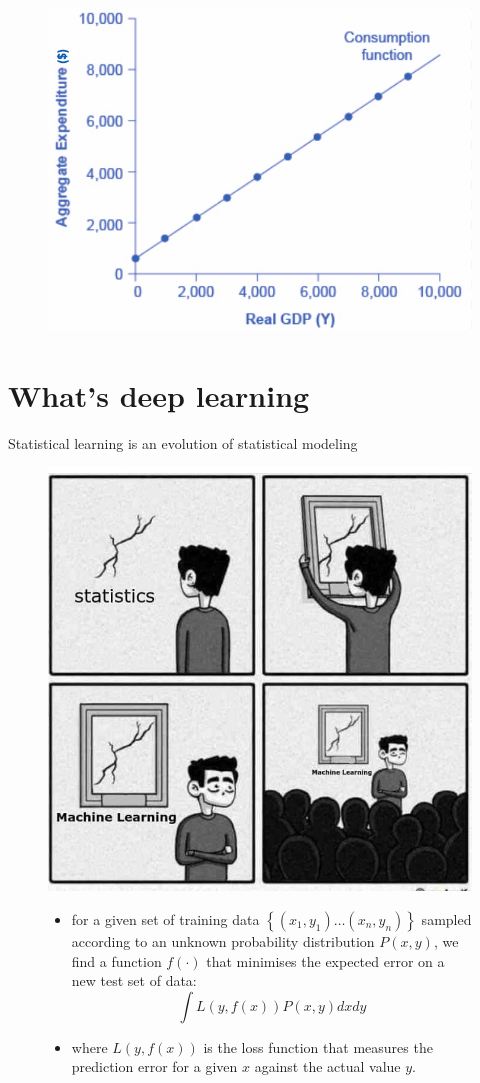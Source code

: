 \documentclass[12pt]{beamer}
\begin{document}
\begin{frame}
	\begin{figure}
		\centering
		\includegraphics[width=.75\linewidth]{income}
	\end{figure}
\end{frame}

\section{What's deep learning}

\begin{frame}{Statistical learning is an evolution of statistical modeling}
	\footnotesize
	\centering
	\begin{figure}
		\centering
		\includegraphics[width=.45\linewidth]{ML}

\begin{itemize}
				\tiny
		\item  for a given set of training data $\left\{\left(x_{1}, y_{1}\right) \ldots\left(x_{n}, y_{n}\right)\right\}$ sampled according to an unknown probability distribution $P(x, y)$, we find a function $f(\cdot)$ that minimises the expected error on a new test set of data:
			$$
			\int L(y, f(x)) P(x, y) d x d y
			$$
		\item	where $L(y, f(x))$ is the loss function that measures the prediction error for a given $x$ against the actual value $y$.			 
\end{itemize}
\end{figure}
\end{frame}
\end{document}
